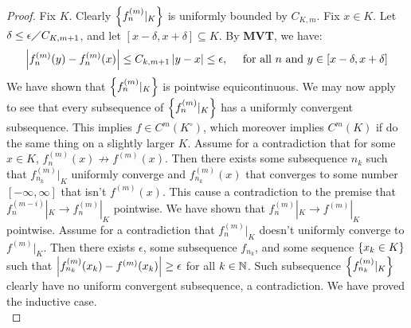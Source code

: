 \documentclass{report}
\begin{document}
\begin{proof}
Fix $K$. Clearly $\left\{ f_n^{(m)}|_K \right\}$ is uniformly bounded by $C_{K,m}$. Fix $x \in K$. Let $\delta \leq \epsilon \diagup C_{K,m+1}$, and let $[x-\delta , x+\delta]\subseteq K$. By \textbf{MVT}, we have: 
\begin{align*}
\left|f_n^{(m)}(y)-f_n^{(m)}(x)\right|\leq C_{k,m+1} \left|y-x\right|\leq \epsilon ,\quad \text{ for all $n$ and $y\in [x-\delta, x+\delta]$}
\end{align*}
We have shown that $\left\{ f_n^{(m)}|_K \right\}$ is pointwise equicontinuous. We may now apply  to see that every subsequence of $\left\{ f^{(m)}_n|_K \right\}$ has a uniformly convergent subsequence. This implies $f \in C^m (K^\circ )$, which moreover implies $C^m(K)$ if do the same thing on a slightly larger $K$. Assume for a contradiction that for some $x \in K$, $f^{(m)}_n (x)\not \rightarrow f^{(m)}(x)$. Then there exists some subsequence  $n_k$ such that $f_{n_k}^{(m)}|_K$ uniformly converge and  $f_{n_k}^{(m)}(x)$ that converges to some number $[-\infty,\infty]$ that isn't $f^{(m)}(x)$. This cause a contradiction to the premise that $f_n^{(m-i)}|_K\rightarrow f_n^{(m)}|_K$ pointwise. We have shown that $f_n^{(m)}|_K \rightarrow f^{(m)}|_K$ pointwise. Assume for a contradiction that $f_n^{(m)}|_K$  doesn't uniformly converge to $f^{(m)}|_K$.   Then  there exists $\epsilon $, some subsequence $f_{n_k}$, and some sequence $\left\{ x_k \in K \right\}$ such that $\left|f_{n_k}^{(m)}(x_k)- f^{(m)}(x_k)\right|\geq \epsilon $ for all $k\in\mathbb{N}$. Such subsequence $\left\{ f_{n_k}^{(m)}|_K \right\}$ clearly have no uniform convergent subsequence, a contradiction. We have proved the inductive case.\\



\end{proof} 
\end{document}
